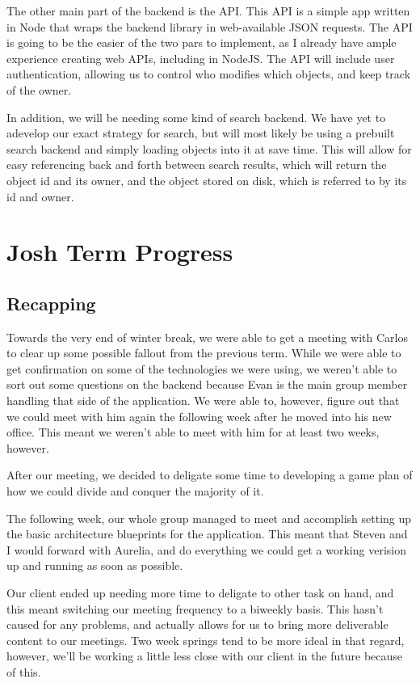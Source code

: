 \documentclass[onecolumn, draftclsnofoot,10pt, compsoc]{IEEEtran}
\begin{document}
The other main part of the backend is the API. This API is a simple app written
in Node that wraps the backend library in web-available JSON requests. The API
is going to be the easier of the two pars to implement, as I already have ample
experience creating web APIs, including in NodeJS. The API will include user
authentication, allowing us to control who modifies which objects, and keep
track of the owner.

In addition, we will be needing some kind of search backend. We have yet to
adevelop our exact strategy for search, but will most likely be using a prebuilt
search backend and simply loading objects into it at save time. This will allow
for easy referencing back and forth between search results, which will return
the object id and its owner, and the object stored on disk, which is referred to
by its id and owner.

\section{Josh Term Progress}
\subsection{Recapping}
Towards the very end of winter break, we were able to get a meeting with Carlos to clear
up some possible fallout from the previous term. While we were able to get
confirmation on some of the technologies we were using, we weren't able to sort out some
questions on the backend because Evan is the main group member handling that side of the
application. We were able to, however, figure out that we could meet with
him again the following week after he moved into his new office. This meant we weren't
able to meet with him for at least two weeks, however.

After our meeting, we decided to deligate some time to developing a game plan of how we
could divide and conquer the majority of it.

The following week, our whole group managed to meet and accomplish setting up the basic
architecture blueprints for the application. This meant that Steven and I would forward
with Aurelia, and do everything we could get a working verision up and running as soon
as possible.

Our client ended up needing more time to deligate to other task on hand, and this meant
switching our meeting frequency to a biweekly basis. This hasn't caused for any problems,
and actually allows for us to bring more deliverable content to our meetings. Two week
springs tend to be more ideal in that regard, however, we'll be working a little less
close with our client in the future because of this.
\end{document}
